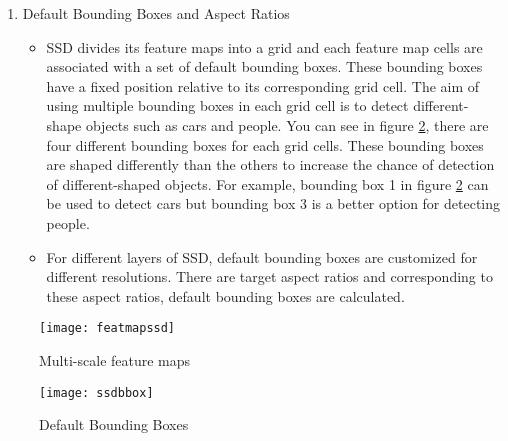 \documentclass{article}
\begin{document}
\begin{enumerate}
    \item Default Bounding Boxes and Aspect Ratios
    \begin{itemize}
        \item SSD divides its feature maps into a grid and each feature map cells are 
associated with a set of default bounding boxes. These bounding boxes have a fixed position 
relative to its corresponding grid cell. The aim of using multiple bounding boxes 
in each grid cell is to detect different-shape objects such as cars and people. You can see in 
figure \ref{fig:ssdbbox1}, there are four different bounding boxes for each grid cells. These bounding 
boxes are shaped differently than the others to increase the chance of detection of different-shaped 
objects. For example, bounding box 1 in figure \ref{fig:ssdbbox1} can be used to detect cars but 
bounding box 3 is a better option for detecting people.
        \item For different layers of SSD, default bounding boxes are customized for 
different resolutions. There are target aspect ratios and corresponding to these 
aspect ratios, default bounding boxes are calculated.
    \end{itemize}
\end{enumerate}

\begin{figure}
    \centering
    \texttt{[image: featmapssd]}
    \caption{Multi-scale feature maps}
    \label{fig:featmapssd1}
\end{figure}

\begin{figure}
    \centering
    \texttt{[image: ssdbbox]}
    \caption{Default Bounding Boxes}
    \label{fig:ssdbbox1}
\end{figure}
\end{document}
